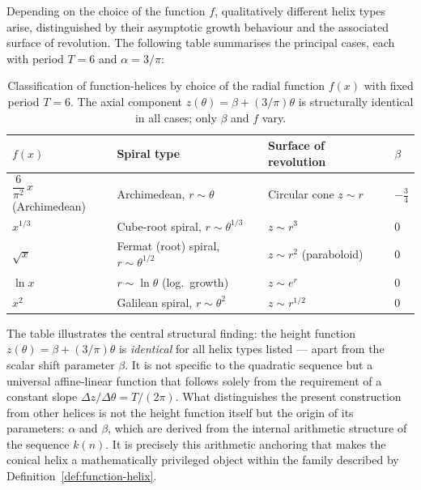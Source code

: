 Depending on the choice of the function $f$, qualitatively different
helix types arise, distinguished by their asymptotic growth behaviour
and the associated surface of revolution. The following table summarises
the principal cases, each with period $T = 6$ and $\alpha = 3/\pi$:

\begin{table}[H]
\centering
\caption{Classification of function-helices by choice of the radial
  function $f(x)$ with fixed period $T = 6$. The axial component
  $z(\theta) = \beta + (3/\pi)\theta$ is structurally identical in all
  cases; only $\beta$ and $f$ vary.}
\renewcommand{\arraystretch}{1.4}
\begin{tabular}{llll}
\toprule
$f(x)$ & Spiral type & Surface of revolution & $\beta$ \\
\midrule
$\dfrac{6}{\pi^2}\,x$\quad (Archimedean)
  & Archimedean, $r \sim \theta$
  & Circular cone $z \sim r$
  & $-\tfrac{3}{4}$ \\[6pt]
$x^{1/3}$
  & Cube-root spiral, $r \sim \theta^{1/3}$
  & $z \sim r^3$
  & $0$ \\[4pt]
$\sqrt{x}$
  & Fermat (root) spiral, $r \sim \theta^{1/2}$
  & $z \sim r^2$ (paraboloid)
  & $0$ \\[4pt]
$\ln x$
  & $r \sim \ln\theta$ (log.\ growth)
  & $z \sim e^r$
  & $0$ \\[4pt]
$x^2$
  & Galilean spiral, $r \sim \theta^2$
  & $z \sim r^{1/2}$
  & $0$ \\
\bottomrule
\end{tabular}
\end{table}

\begin{remark}\label{rem:universality-height}
The table illustrates the central structural finding: the height function
$z(\theta) = \beta + (3/\pi)\theta$ is \emph{identical} for all helix
types listed --- apart from the scalar shift parameter $\beta$. It is
not specific to the quadratic sequence but a universal affine-linear
function that follows solely from the requirement of a constant slope
$\Delta z / \Delta\theta = T/(2\pi)$. What distinguishes the present
construction from other helices is not the height function itself but the
origin of its parameters: $\alpha$ and $\beta$, which are derived from
the internal arithmetic structure of the sequence $k(n)$. It is
precisely this arithmetic anchoring that makes the conical helix a
mathematically privileged object within the family described by
Definition~\ref{def:function-helix}.
\end{remark}

